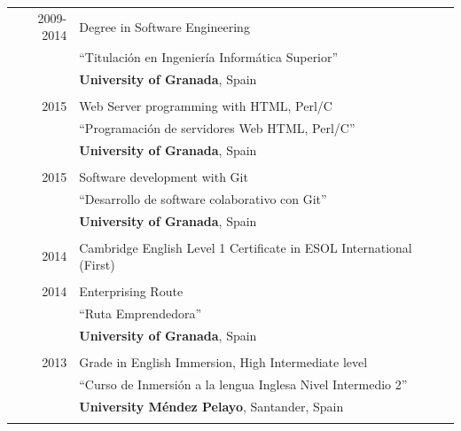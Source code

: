 \documentclass[a4paper,10pt]{article} %
\begin{document}
\begin{tabular}{rl}	

\textsc{2009-2014}& Degree in Software Engineering
\\& ``Titulación en Ingeniería Informática Superior''
\\& \normalsize\textbf{University of Granada}, Spain\\
&\\


\textsc{2015} & Web Server programming with HTML, Perl/C 
\\& ``Programación de servidores Web HTML, Perl/C''
\\& \normalsize\textbf{University of Granada}, Spain\\
&\\


\textsc{2015} & Software development with Git
\\& ``Desarrollo de software colaborativo con Git''
\\& \normalsize\textbf{University of Granada}, Spain\\
&\\


\textsc{2014} & Cambridge English Level 1 Certificate in ESOL International
(First)\\
&\\


\textsc{2014} & Enterprising Route 
\\& ``Ruta Emprendedora''
\\& \normalsize\textbf{University of Granada}, Spain\\
&\\


\textsc{2013} & Grade in English Immersion, High Intermediate level 
\\& ``Curso de Inmersión a la lengua Inglesa Nivel Intermedio 2''
\\& \normalsize\textbf{University Méndez Pelayo}, Santander, Spain\\
&\\



\end{tabular}
\end{document}
